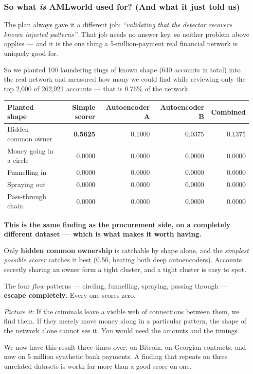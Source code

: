 \documentclass[11pt,a4paper]{article}
\newcommand{\pw}[1]{\textit{\textcolor{accent}{Picture it:}} #1}
\begin{document}
\subsubsection*{So what \emph{is} AMLworld used for? (And what it just told us)}

The plan always gave it a different job: \emph{``validating that the detector
recovers known injected patterns''}. That job needs no answer key, so neither
problem above applies --- and it is the one thing a 5-million-payment real
financial network is uniquely good for.

So we planted 100 laundering rings of known shape (640 accounts in total) into
the real network and measured how many we could find while reviewing only the
top 2{,}000 of 262{,}921 accounts --- that is 0.76\% of the network.

\begin{center}\small
\begin{tabular}{@{}lrrrr@{}}
\toprule
\textbf{Planted shape} & \textbf{Simple scorer} & \textbf{Autoencoder A} &
\textbf{Autoencoder B} & \textbf{Combined} \\
\midrule
Hidden common owner & \textbf{0.5625} & 0.1000 & 0.0375 & 0.1375 \\
Money going in a circle & 0.0000 & 0.0000 & 0.0000 & 0.0000 \\
Funnelling in & 0.0000 & 0.0000 & 0.0000 & 0.0000 \\
Spraying out & 0.0000 & 0.0000 & 0.0000 & 0.0000 \\
Pass-through chain & 0.0000 & 0.0000 & 0.0000 & 0.0000 \\
\bottomrule
\end{tabular}
\end{center}

\begin{keybox}
\textbf{This is the same finding as the procurement side, on a completely
different dataset --- which is what makes it worth having.}

Only \textbf{hidden common ownership} is catchable by shape alone, and the
\emph{simplest possible scorer} catches it best (0.56, beating both deep
autoencoders). Accounts secretly sharing an owner form a tight cluster, and a
tight cluster is easy to spot.

The four \emph{flow} patterns --- circling, funnelling, spraying, passing
through --- \textbf{escape completely}. Every one scores zero.

\pw{If the criminals leave a visible web of connections between them, we find
them. If they merely move money along in a particular pattern, the shape of the
network alone cannot see it. You would need the amounts and the timings.}

We now have this result three times over: on Bitcoin, on Georgian contracts, and
now on 5 million synthetic bank payments. A finding that repeats on three
unrelated datasets is worth far more than a good score on one.
\end{keybox}
\end{document}
